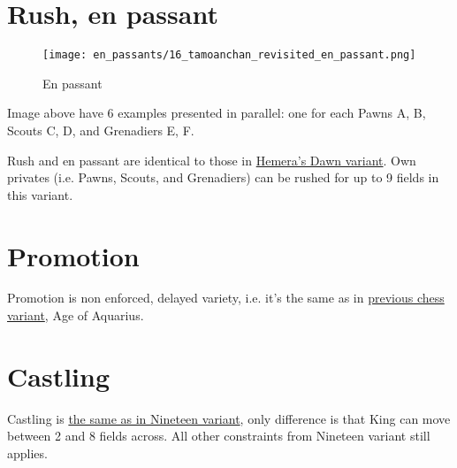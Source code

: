 \clearpage %

\section*{Rush, en passant}
\label{sec:Tamoanchan Revisited/Rush, en passant}

\vspace*{-1.4\baselineskip}
\noindent
\begin{figure}[!h]
\texttt{[image: en\_passants/16\_tamoanchan\_revisited\_en\_passant.png]}
\vspace*{-1.3\baselineskip}
\caption{En passant}
\label{fig:16_tamoanchan_revisited_en_passant}
\end{figure}

\vspace*{-0.5\baselineskip}
Image above have 6 examples presented in parallel: one for each Pawns A, B,
Scouts C, D, and Grenadiers E, F.

Rush and en passant are identical to those in
\hyperref[fig:14_hemera_s_dawn_en_passant]{Hemera's Dawn variant}.
Own privates (i.e. Pawns, Scouts, and Grenadiers) can be rushed for up to 9
fields in this variant.

\clearpage %

\section*{Promotion}
\label{sec:Tamoanchan Revisited/Promotion}

Promotion is non enforced, delayed variety, i.e. it's the same as in
\hyperref[sec:Age of Aquarius/Promotion]{previous chess variant}, Age of Aquarius.

\section*{Castling}
\label{sec:Tamoanchan Revisited/Castling}

Castling is
\hyperref[sec:Nineteen/Castling]{the same as in Nineteen variant},
only difference is that King can move
between 2 and 8 fields across. All other constraints from Nineteen variant still
applies.

